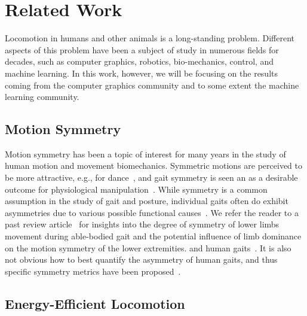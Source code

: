 \chapter{Related Work}
\label{ch:relatedwork}


Locomotion in humans and other animals is a long-standing problem. Different aspects of this problem have been a subject of study in numerous fields for decades, such as computer graphics, robotics, bio-mechanics, control, and machine learning. In this work, however, we will be focusing on the results coming from the computer graphics community and to some extent the machine learning community.




\section{Motion Symmetry}
Motion symmetry has been a topic of interest for many years in the study of human motion and movement biomechanics. 
Symmetric motions are perceived to be more attractive, e.g., for dance~\cite{danceSymmetry},
and gait symmetry is seen an as a desirable outcome for physiological manipulation~\cite{robinson1987use}.
While symmetry is a common assumption in the study of gait and posture, 
individual gaits often do exhibit asymmetries due to various possible functional causes~\cite{seelet}.
We refer the reader to a past review article~\cite{SADEGHI200034} for insights
into the degree of symmetry of lower limbs movement during able-bodied gait
and the potential influence of limb dominance on the motion symmetry of the lower extremities.
and human gaits~\cite{riskowski}.
It is also not obvious how to best quantify 
the asymmetry of human gaits, and thus specific symmetry metrics have been
proposed~\cite{symmetry_measures,symmetry_phase_portrait}.

\section{Energy-Efficient Locomotion}


